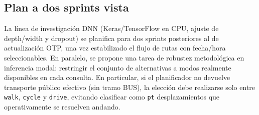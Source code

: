 \subsection{Plan a dos sprints vista}

La línea de investigación DNN (Keras/TensorFlow en CPU, ajuste de depth/width y dropout) se planifica para dos sprints posteriores al de actualización OTP, una vez estabilizado el flujo de rutas con fecha/hora seleccionables. En paralelo, se propone una tarea de robustez metodológica en inferencia modal: restringir el conjunto de alternativas a modos realmente disponibles en cada consulta. En particular, si el planificador no devuelve transporte público efectivo (sin tramo BUS), la elección debe realizarse solo entre \texttt{walk}, \texttt{cycle} y \texttt{drive}, evitando clasificar como \texttt{pt} desplazamientos que operativamente se resuelven andando.
